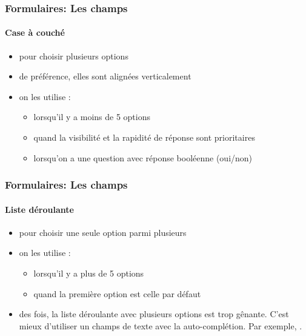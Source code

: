 \documentclass[xcolor=table]{beamer}
\begin{document}
\begin{frame}
\frametitle{Formulaires: Les champs}
\framesubtitle{Case à couché}

\begin{minipage}{0.59\textwidth}
	\begin{itemize}
		\item pour choisir plusieurs options
	\end{itemize}
\end{minipage}
\begin{minipage}{0.40\textwidth}
\end{minipage}

\begin{itemize}
	\item de préférence, elles sont alignées verticalement 
	\item on les utilise : 
	\begin{itemize}
		\item lorsqu'il y a moins de 5 options 
		\item quand la visibilité et la rapidité de réponse sont prioritaires
		\item lorsqu'on a une question avec réponse booléenne (oui/non)
	\end{itemize}
\end{itemize}

\end{frame}


\begin{frame}
\frametitle{Formulaires: Les champs}
\framesubtitle{Liste déroulante}

\begin{minipage}{0.69\textwidth}
	\begin{itemize}
		\item pour choisir une seule option parmi plusieurs
		\item on les utilise : 
		\begin{itemize}
			\item lorsqu'il y a plus de 5 options 
			\item quand la première option est celle par défaut
		\end{itemize}
		\item des fois, la liste déroulante avec plusieurs options est trop gênante. C'est mieux d'utiliser un champs de texte avec la auto-complétion. Par exemple, .
	\end{itemize}
\end{minipage}
\begin{minipage}{0.30\textwidth}
\end{minipage}

\end{frame}
\end{document}
